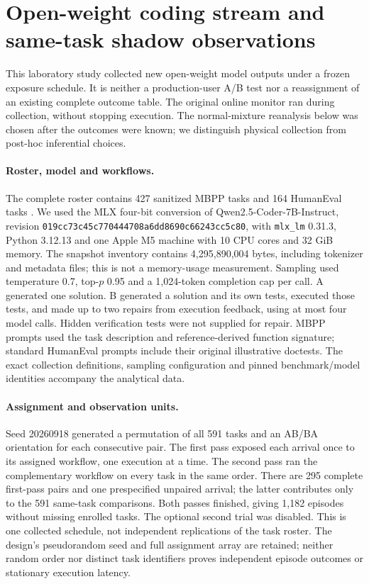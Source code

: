 \section{Open-weight coding stream and same-task shadow observations}
\label{app:open_coding}
This laboratory study collected new open-weight model outputs under a
frozen exposure schedule. It is neither a production-user A/B test nor a
reassignment of an existing complete outcome table. The original online
monitor ran during collection, without stopping execution. The
normal-mixture reanalysis below was chosen after the outcomes were known;
we distinguish physical collection from post-hoc inferential choices.

\paragraph{Roster, model and workflows.}
The complete roster contains 427 sanitized MBPP tasks
\citep{austin2021program} and 164 HumanEval tasks \citep{chen2021evaluating}.
We used the MLX four-bit conversion of Qwen2.5-Coder-7B-Instruct,
revision \texttt{019cc73c45c770444708a6dd8690c66243cc5c80}, with
\texttt{mlx\_lm} 0.31.3, Python 3.12.13 and one Apple M5 machine with
10 CPU cores and 32 GiB memory. The snapshot inventory contains
4,295,890,004 bytes, including tokenizer and metadata files; this is not
a memory-usage measurement. Sampling used temperature 0.7, top-$p$ 0.95
and a 1,024-token completion cap per call. A generated one solution. B generated
a solution and its own tests, executed those tests, and made up to two
repairs from execution feedback, using at most four model calls.
Hidden verification tests were not supplied for repair. MBPP prompts used
the task description and reference-derived function signature; standard
HumanEval prompts include their original illustrative doctests.
The exact collection definitions, sampling configuration and pinned
benchmark/model identities accompany the analytical data.

\paragraph{Assignment and observation units.}
Seed 20260918 generated a permutation of all 591 tasks and an AB/BA
orientation for each consecutive pair. The first pass exposed each
arrival once to its assigned workflow, one execution at a time. The
second pass ran the complementary workflow on every task in the same
order. There are 295 complete first-pass pairs and one prespecified
unpaired arrival; the latter contributes only to the 591 same-task
comparisons. Both passes finished, giving 1,182 episodes without missing
enrolled tasks. The optional second trial was disabled. This is one
collected schedule, not independent replications of the task roster.
The design's pseudorandom seed and full assignment array are retained;
neither random order nor distinct task identifiers proves independent
episode outcomes or stationary execution latency.

